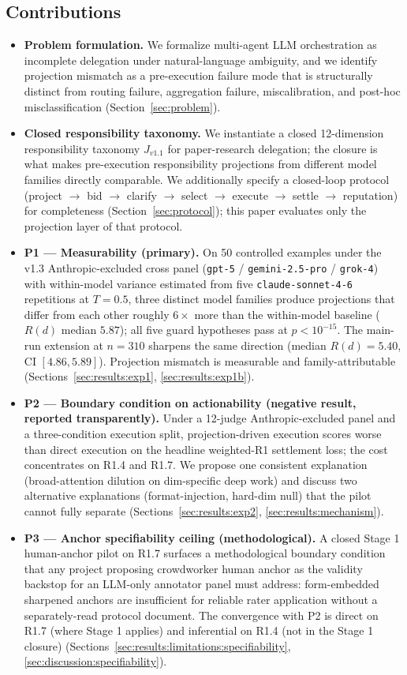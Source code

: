 \subsection*{Contributions}

\begin{itemize}
    \item \textbf{Problem formulation.} We formalize multi-agent LLM orchestration as incomplete delegation under natural-language ambiguity, and we identify projection mismatch as a pre-execution failure mode that is structurally distinct from routing failure, aggregation failure, miscalibration, and post-hoc misclassification (Section~\ref{sec:problem}).
    \item \textbf{Closed responsibility taxonomy.} We instantiate a closed 12-dimension responsibility taxonomy $J_{v1.1}$ for paper-research delegation; the closure is what makes pre-execution responsibility projections from different model families directly comparable. We additionally specify a closed-loop protocol (project $\to$ bid $\to$ clarify $\to$ select $\to$ execute $\to$ settle $\to$ reputation) for completeness (Section~\ref{sec:protocol}); this paper evaluates only the projection layer of that protocol.
    \item \textbf{P1 --- Measurability (primary).} On 50 controlled examples under the v1.3 Anthropic-excluded cross panel (\texttt{gpt-5} / \texttt{gemini-2.5-pro} / \texttt{grok-4}) with within-model variance estimated from five \texttt{claude-sonnet-4-6} repetitions at $T = 0.5$, three distinct model families produce projections that differ from each other roughly $6\times$ more than the within-model baseline ($R(d)$ median $5.87$); all five guard hypotheses pass at $p < 10^{-15}$. The main-run extension at $n = 310$ sharpens the same direction (median $R(d) = 5.40$, CI $[4.86, 5.89]$). Projection mismatch is measurable and family-attributable (Sections~\ref{sec:results:exp1}, \ref{sec:results:exp1b}).
    \item \textbf{P2 --- Boundary condition on actionability (negative result, reported transparently).} Under a 12-judge Anthropic-excluded panel and a three-condition execution split, projection-driven execution scores worse than direct execution on the headline weighted-R1 settlement loss; the cost concentrates on R1.4 and R1.7. We propose one consistent explanation (broad-attention dilution on dim-specific deep work) and discuss two alternative explanations (format-injection, hard-dim null) that the pilot cannot fully separate (Sections~\ref{sec:results:exp2}, \ref{sec:results:mechanism}).
    \item \textbf{P3 --- Anchor specifiability ceiling (methodological).} A closed Stage 1 human-anchor pilot on R1.7 surfaces a methodological boundary condition that any project proposing crowdworker human anchor as the validity backstop for an LLM-only annotator panel must address: form-embedded sharpened anchors are insufficient for reliable rater application without a separately-read protocol document. The convergence with P2 is direct on R1.7 (where Stage 1 applies) and inferential on R1.4 (not in the Stage 1 closure) (Sections~\ref{sec:results:limitations:specifiability}, \ref{sec:discussion:specifiability}).
\end{itemize}
